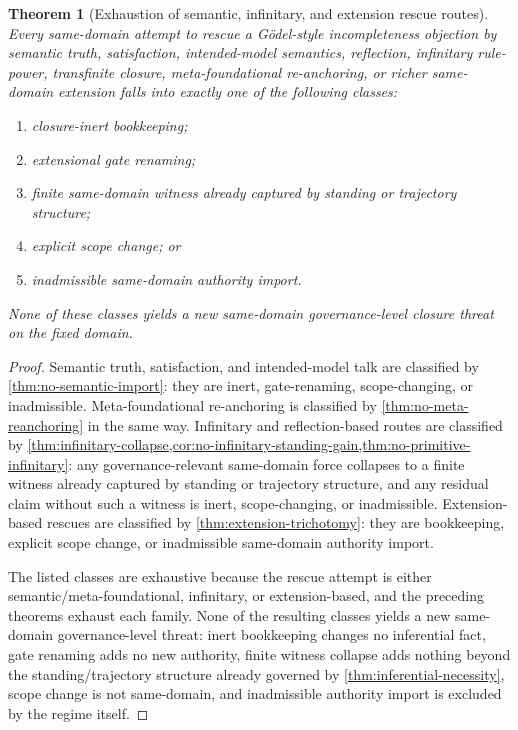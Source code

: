 \documentclass[11pt]{article}
\theoremstyle{plain}
\newtheorem{theorem}{Theorem}[section]
\theoremstyle{definition}
\begin{document}
\begin{theorem}[Exhaustion of semantic, infinitary, and extension rescue routes]
\label{thm:rescue-exhaustion}
Every same-domain attempt to rescue a G\"odel-style incompleteness objection by semantic truth, satisfaction, intended-model semantics, reflection, infinitary rule-power, transfinite closure, meta-foundational re-anchoring, or richer same-domain extension falls into exactly one of the following classes:
\begin{enumerate}[label=(\roman*), leftmargin=2.5em]
    \item closure-inert bookkeeping;
    \item extensional gate renaming;
    \item finite same-domain witness already captured by standing or trajectory structure;
    \item explicit scope change; or
    \item inadmissible same-domain authority import.
\end{enumerate}
None of these classes yields a new same-domain governance-level closure threat on the fixed domain.
\end{theorem}

\begin{proof}
Semantic truth, satisfaction, and intended-model talk are classified by \cref{thm:no-semantic-import}: they are inert, gate-renaming, scope-changing, or inadmissible. Meta-foundational re-anchoring is classified by \cref{thm:no-meta-reanchoring} in the same way. Infinitary and reflection-based routes are classified by \cref{thm:infinitary-collapse,cor:no-infinitary-standing-gain,thm:no-primitive-infinitary}: any governance-relevant same-domain force collapses to a finite witness already captured by standing or trajectory structure, and any residual claim without such a witness is inert, scope-changing, or inadmissible. Extension-based rescues are classified by \cref{thm:extension-trichotomy}: they are bookkeeping, explicit scope change, or inadmissible same-domain authority import.

The listed classes are exhaustive because the rescue attempt is either semantic/meta-foundational, infinitary, or extension-based, and the preceding theorems exhaust each family. None of the resulting classes yields a new same-domain governance-level threat: inert bookkeeping changes no inferential fact, gate renaming adds no new authority, finite witness collapse adds nothing beyond the standing/trajectory structure already governed by \cref{thm:inferential-necessity}, scope change is not same-domain, and inadmissible authority import is excluded by the regime itself.
\end{proof}
\end{document}
